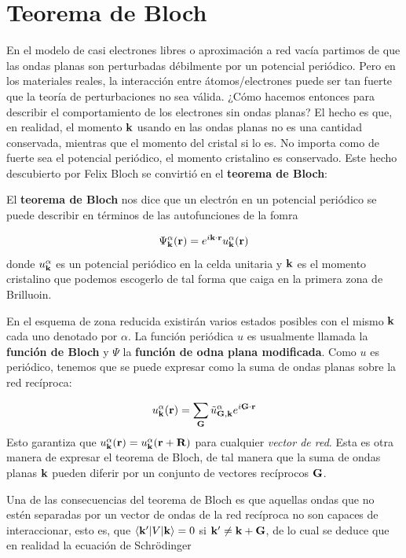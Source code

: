 \section{Teorema de Bloch}

En el modelo de casi electrones libres o aproximación a red vacía partimos de que las ondas planas son perturbadas débilmente por un potencial periódico. Pero en los materiales reales, la interacción entre átomos/electrones puede ser tan fuerte que la teoría de perturbaciones no sea válida. ¿Cómo hacemos entonces para describir el comportamiento de los electrones sin ondas planas? El hecho es que, en realidad, el momento $\mathbf{k}$ usando en las ondas planas no es una cantidad conservada, mientras que el momento del cristal si lo es. No importa como de fuerte sea el potencial periódico, el momento cristalino es conservado. Este hecho descubierto por Felix Bloch se convirtió en el \textbf{teorema de Bloch}:

\begin{mybox}
	El \textbf{teorema de Bloch} nos dice que un electrón en un potencial periódico se puede describir en términos de las autofunciones de la fomra
	
	\begin{equation}
		\Psi_{\mathbf{k}}^\alpha (\mathbf{r}) = e^{i\mathbf{k} \cdot \mathbf{r}} u_{\mathbf{k}}^\alpha (\mathbf{r})
	\end{equation}
	donde $u_{\mathbf{k}}^\alpha$ es un potencial periódico en la celda unitaria y $\mathbf{k}$ es el momento cristalino que podemos escogerlo de tal forma que caiga en la primera zona de Brilluoin.
\end{mybox}
En el esquema de zona reducida existirán varios estados posibles con el mismo $\mathbf{k}$ cada uno denotado por $\alpha$. La función periódica $u$ es usualmente llamada la \textbf{función de Bloch} y $\Psi$ la \textbf{función de odna plana modificada}. Como $u$ es periódico, tenemos que se puede expresar como la suma de ondas planas sobre la red recíproca:

\begin{equation}
	u_{\mathbf{k}}^\alpha (\mathbf{r}) = \sum_{\mathbf{G}} \tilde{u}^{\alpha}_{\mathbf{G},\mathbf{k}} e^{i\mathbf{G} \cdot \mathbf{r}}
\end{equation}
Esto garantiza que $u_{\mathbf{k}}^\alpha (\mathbf{r}) = u_{\mathbf{k}}^{\alpha} (\mathbf{r} + \mathbf{R})$ para cualquier \textit{vector de red}. Esta es otra manera de expresar el teorema de Bloch, de tal manera que la suma de ondas planas $\mathbf{k}$ pueden diferir por un conjunto de vectores recíprocos $\mathbf{G}$.

Una de las consecuencias del teorema de Bloch es que aquellas ondas que no estén separadas por un vector de ondas de la red recíproca no son capaces de interaccionar, esto es, que $\langle \mathbf{k}'|V|\mathbf{k} \rangle=0$ si $\mathbf{k}' \neq \mathbf{k} + \mathbf{G}$, de lo cual se deduce que en realidad la ecuación de Schrödinger 

